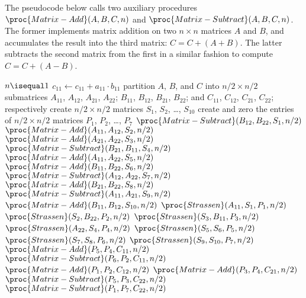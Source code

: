 The pseudocode below calls two auxiliary procedures $\proc{Matrix-Add}(A,B,C,n)$ and $\proc{Matrix-Subtract}(A,B,C,n)$.
The former implements matrix addition on two $n\times n$ matrices $A$ and $B$, and accumulates the result into the third matrix: $C=C+(A+B)$.
The latter subtracts the second matrix from the first in a similar fashion to compute $C=C+(A-B)$.

\begin{codebox}
\li \If $n\isequal1$
\li     \Then $c_{11}\gets c_{11}+a_{11}\cdot b_{11}$
\li         \Return
        \End
\li partition $A$, $B$, and $C$ into $n/2\times n/2$ submatrices
    \Indentmore
\zi     $A_{11}$, $A_{12}$, $A_{21}$, $A_{22}$; $B_{11}$, $B_{12}$, $B_{21}$, $B_{22}$;
\zi     and $C_{11}$, $C_{12}$, $C_{21}$, $C_{22}$; respectively
    \End
\li create $n/2\times n/2$ matrices $S_1$, $S_2$, \dots, $S_{10}$
\li create and zero the entries of $n/2\times n/2$ matrices $P_1$, $P_2$, \dots, $P_7$
\li $\proc{Matrix-Subtract}(B_{12},B_{22},S_1,n/2)$
\li $\proc{Matrix-Add}(A_{11},A_{12},S_2,n/2)$
\li $\proc{Matrix-Add}(A_{21},A_{22},S_3,n/2)$
\li $\proc{Matrix-Subtract}(B_{21},B_{11},S_4,n/2)$
\li $\proc{Matrix-Add}(A_{11},A_{22},S_5,n/2)$
\li $\proc{Matrix-Add}(B_{11},B_{22},S_6,n/2)$
\li $\proc{Matrix-Subtract}(A_{12},A_{22},S_7,n/2)$
\li $\proc{Matrix-Add}(B_{21},B_{22},S_8,n/2)$
\li $\proc{Matrix-Subtract}(A_{11},A_{21},S_9,n/2)$
\li $\proc{Matrix-Add}(B_{11},B_{12},S_{10},n/2)$
\li $\proc{Strassen}(A_{11},S_1,P_1,n/2)$
\li $\proc{Strassen}(S_2,B_{22},P_2,n/2)$
\li $\proc{Strassen}(S_3,B_{11},P_3,n/2)$
\li $\proc{Strassen}(A_{22},S_4,P_4,n/2)$
\li $\proc{Strassen}(S_5,S_6,P_5,n/2)$
\li $\proc{Strassen}(S_7,S_8,P_6,n/2)$
\li $\proc{Strassen}(S_9,S_{10},P_7,n/2)$
\li $\proc{Matrix-Add}(P_5,P_4,C_{11},n/2)$
\li $\proc{Matrix-Subtract}(P_6,P_2,C_{11},n/2)$
\li $\proc{Matrix-Add}(P_1,P_2,C_{12},n/2)$
\li $\proc{Matrix-Add}(P_3,P_4,C_{21},n/2)$
\li $\proc{Matrix-Subtract}(P_5,P_3,C_{22},n/2)$
\li $\proc{Matrix-Subtract}(P_1,P_7,C_{22},n/2)$
\end{codebox}
